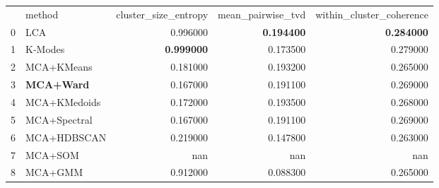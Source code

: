 \begin{tabular}{llrrr}
 & method & cluster_size_entropy & mean_pairwise_tvd & within_cluster_coherence \\
0 & LCA & 0.996000 & \bfseries 0.194400 & \bfseries 0.284000 \\
1 & K-Modes & \bfseries 0.999000 & 0.173500 & 0.279000 \\
2 & MCA+KMeans & 0.181000 & 0.193200 & 0.265000 \\
3 & \bfseries MCA+Ward & 0.167000 & 0.191100 & 0.269000 \\
4 & MCA+KMedoids & 0.172000 & 0.193500 & 0.268000 \\
5 & MCA+Spectral & 0.167000 & 0.191100 & 0.269000 \\
6 & MCA+HDBSCAN & 0.219000 & 0.147800 & 0.263000 \\
7 & MCA+SOM & nan & nan & nan \\
8 & MCA+GMM & 0.912000 & 0.088300 & 0.265000 \\
\end{tabular}
